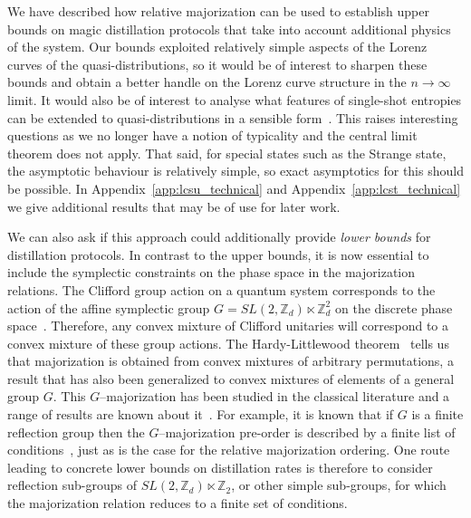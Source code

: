\documentclass[pra,
aps,
twocolumn,
superscriptaddress,
groupedaddress,
nofootinbib,
reprint
]{revtex4-1}
\begin{document}
We have described how relative majorization can be used to establish upper bounds on magic distillation protocols that take into account additional physics of the system. Our bounds exploited relatively simple aspects of the Lorenz curves of the quasi-distributions, so it would be of interest to sharpen these bounds and obtain a better handle on the Lorenz curve structure in the $n\rightarrow \infty$ limit. It would also be of interest to analyse what features of single-shot entropies can be extended to quasi-distributions in a sensible form~\cite{renner_phd, tomamichel2013}. This raises interesting questions as we no longer have a notion of typicality and the central limit theorem does not apply. That said, for special states such as the Strange state, the asymptotic behaviour is relatively simple, so exact asymptotics for this should be possible. In Appendix~\ref{app:lcsu_technical} and Appendix~\ref{app:lcst_technical} we give additional results that may be of use for later work.

We can also ask if this approach could additionally provide \emph{lower bounds} for distillation protocols. In contrast to the upper bounds, it is now essential to include the symplectic constraints on the phase space in the majorization relations. The Clifford group action on a quantum system corresponds to the action of the affine symplectic group $G=SL(2,\mathbb{Z}_d) \ltimes \mathbb{Z}_d^2$ on the discrete phase space~\cite{Appleby_2005, cit:bengtsson}. Therefore, any convex mixture of Clifford unitaries will correspond to a convex mixture of these group actions. The Hardy-Littlewood theorem~\cite{hardy_1952} tells us that majorization is obtained from convex mixtures of arbitrary permutations, a result that has also been generalized to convex mixtures of elements of a general group $G$. This $G$--majorization has been studied in the classical literature and a range of results are known about it~\cite{giovagnoli_1985, steerneman_1990, eaton_1977}. For example, it is known that if $G$ is a finite reflection group then the $G$--majorization pre-order is described by a finite list of conditions~\cite{giovagnoli_1985}, just as is the case for the relative majorization ordering. One route leading to concrete lower bounds on distillation rates is therefore to consider reflection sub-groups of $SL(2,\mathbb{Z}_d) \ltimes \mathbb{Z}_2$, or other simple sub-groups, for which the majorization relation reduces to a finite set of conditions.
  
\end{document}
